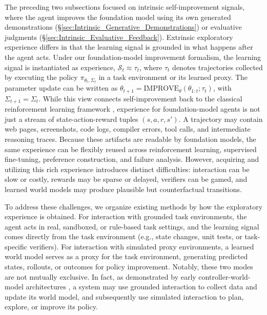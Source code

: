 \documentclass{article}
\begin{document}
The preceding two subsections focused on intrinsic self-improvement signals, where the agent improves the foundation model using its own generated demonstrations (\S \ref{sec:Intrinsic_Generative_Demonstrations}) or evaluative judgments (\S \ref{sec:Intrinsic_Evaluative_Feedback}). Extrinsic exploratory experience differs in that the learning signal is grounded in what happens after the agent acts. Under our foundation-model improvement formalism, the learning signal is instantiated as experience, $\mathcal{S}_t \approx \tau_t$, where $\tau_t$ denotes trajectories collected by executing the policy $\pi_{\theta_t, \Sigma_t}$ in a task environment or its learned proxy. The parameter update can be written as $\theta_{t+1} = \text{IMPROVE}_\theta(\theta_{1:t}; \tau_t)$, with $\Sigma_{t+1} = \Sigma_t$. While this view connects self-improvement back to the classical reinforcement learning framework \citep{silver2025welcome, zhao2024expel}, experience for foundation-model agents is not just a stream of state-action-reward tuples $(s,a,r,s')$. A trajectory may contain web pages, screenshots, code logs, compiler errors, tool calls, and intermediate reasoning traces. Because these artifacts are readable by foundation models, the same experience can be flexibly reused across reinforcement learning, supervised fine-tuning, preference construction, and failure analysis. However, acquiring and utilizing this rich experience introduces distinct difficulties: interaction can be slow or costly, rewards may be sparse or delayed, verifiers can be gamed, and learned world models \citep{schmidhuber1990making, schmidhuber2015learning,nanbo2025facts} may produce plausible but counterfactual transitions.

To address these challenges, we organize existing methods by how the exploratory experience is obtained. For interaction with grounded task environments, the agent acts in real, sandboxed, or rule-based task settings, and the learning signal comes directly from the task environment (e.g., state changes, unit tests, or task-specific verifiers). For interaction with simulated proxy environments, a learned world model serves as a proxy for the task environment, generating predicted states, rollouts, or outcomes for policy improvement. Notably, these two modes are not mutually exclusive. In fact, as demonstrated by early controller-world-model architectures \citep{schmidhuber1990making}, a system may use grounded interaction to collect data and update its world model, and subsequently use simulated interaction to plan, explore, or improve its policy.
\end{document}

